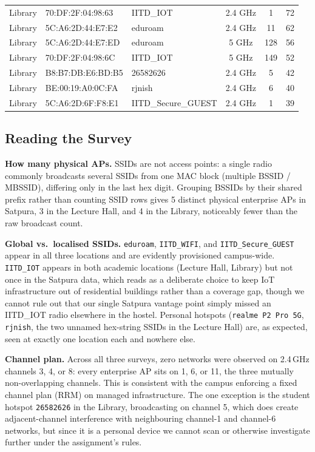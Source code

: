 \begin{table}[H]
\begin{tabular}{@{}p{1.8cm}p{3.0cm}p{3.2cm}ccc@{}}
Library & 70:DF:2F:04:98:63 & IITD\_IOT & 2.4 GHz & 1 & 72 \\
Library & 5C:A6:2D:44:E7:E2 & eduroam & 2.4 GHz & 11 & 62 \\
Library & 5C:A6:2D:44:E7:ED & eduroam & 5 GHz & 128 & 56 \\
Library & 70:DF:2F:04:98:6C & IITD\_IOT & 5 GHz & 149 & 52 \\
Library & B8:B7:DB:E6:BD:B5 & 26582626 & 2.4 GHz & 5 & 42 \\
Library & BE:00:19:A0:0C:FA & rjnish & 2.4 GHz & 6 & 40 \\
Library & 5C:A6:2D:6F:F8:E1 & IITD\_Secure\_GUEST & 2.4 GHz & 1 & 39 \\
\bottomrule
\end{tabular}
\end{table}

\subsection{Reading the Survey}
\textbf{How many physical APs.} SSIDs are not access points: a single radio commonly
broadcasts several SSIDs from one MAC block (multiple BSSID / MBSSID), differing only in the
last hex digit. Grouping BSSIDs by their shared prefix rather than counting SSID rows gives 5
distinct physical enterprise APs in Satpura, 3 in the Lecture Hall, and 4 in the Library,
noticeably fewer than the raw broadcast count.

\textbf{Global vs.\ localised SSIDs.} \texttt{eduroam}, \texttt{IITD\_WIFI}, and
\texttt{IITD\_Secure\_GUEST} appear in all three locations and are evidently provisioned
campus-wide. \texttt{IITD\_IOT} appears in both academic locations (Lecture Hall, Library) but
not once in the Satpura data, which reads as a deliberate choice to keep IoT infrastructure out
of residential buildings rather than a coverage gap, though we cannot rule out that our single
Satpura vantage point simply missed an IITD\_IOT radio elsewhere in the hostel. Personal
hotspots (\texttt{realme P2 Pro 5G}, \texttt{rjnish}, the two unnamed hex-string SSIDs in the
Lecture Hall) are, as expected, seen at exactly one location each and nowhere else.

\textbf{Channel plan.} Across all three surveys, zero networks were observed on 2.4\,GHz
channels 3, 4, or 8: every enterprise AP sits on 1, 6, or 11, the three mutually
non-overlapping channels. This is consistent with the campus enforcing a fixed channel plan
(RRM) on managed infrastructure. The one exception is the student hotspot \texttt{26582626} in
the Library, broadcasting on channel 5, which does create adjacent-channel interference with
neighbouring channel-1 and channel-6 networks, but since it is a personal device we cannot
scan or otherwise investigate further under the assignment's rules.

